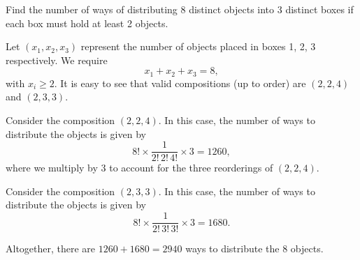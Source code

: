 \begin{problem}
    Find the number of ways of distributing 8 distinct objects into 3 distinct boxes if each box must hold at least 2 objects.
\end{problem}
\begin{solution}
    Let $(x_1, x_2, x_3)$ represent the number of objects placed in boxes 1, 2, 3 respectively. We require \[x_1 + x_2 + x_3 = 8,\] with $x_i \geq 2$. It is easy to see that valid compositions (up to order) are $(2,2,4)$ and $(2, 3, 3)$.

     Consider the composition $(2, 2, 4)$. In this case, the number of ways to distribute the objects is given by \[8! \times \frac1{2! \, 2! \, 4!} \times 3 = 1260,\] where we multiply by 3 to account for the three reorderings of $(2, 2, 4)$.

     Consider the composition $(2, 3, 3)$. In this case, the number of ways to distribute the objects is given by \[8! \times \frac1{2! \, 3! \, 3!} \times 3 = 1680.\]

    Altogether, there are $1260 + 1680 = 2940$ ways to distribute the 8 objects.
\end{solution}

